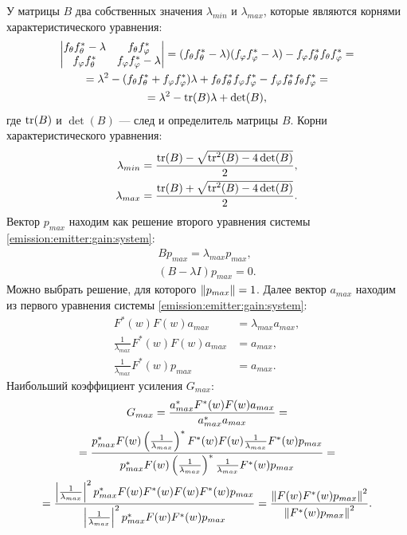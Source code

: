 У матрицы $B$ два собственных значения $\lambda_{min}$ и $\lambda_{max}$, которые являются корнями характеристического уравнения:
\begin{multline*}
    \begin{vmatrix}
        f_\theta f_\theta^* - \lambda & f_{\theta} f_\varphi^*          \\
        f_\varphi f_\theta^*          & f_\varphi f_\varphi^* - \lambda
    \end{vmatrix}
    = (f_\theta f_\theta^* - \lambda) (f_\varphi f_\varphi^* - \lambda) - f_\varphi f_\theta^* f_{\theta} f_\varphi^* = \\
    = \lambda^2 - ( f_\theta f_\theta^* + f_\varphi f_\varphi^* ) \lambda + f_\theta f_\theta^* f_\varphi f_\varphi^* - f_\varphi f_\theta^* f_{\theta} f_\varphi^* = \\
    = \lambda^2 - \operatorname{tr}(B) \lambda + \det(B) ,
\end{multline*}
где $\operatorname{tr}(B)$ и $\det(B)$ --- след и определитель матрицы $B$. Корни характеристического уравнения:
\begin{align}
    \lambda_{min} & = \frac{\operatorname{tr}(B) - \sqrt{\operatorname{tr}^2(B) - 4 \det(B)}}{2} \label{emission:emitter:gain:minimum_eigenvalue} , \\
    \lambda_{max} & = \frac{\operatorname{tr}(B) + \sqrt{\operatorname{tr}^2(B) - 4 \det(B)}}{2} \label{emission:emitter:gain:maximum_eigenvalue}.
\end{align}
Вектор $p_{max}$ находим как решение второго уравнения системы \eqref{emission:emitter:gain:system}:
\begin{gather*}
    B p_{max} = \lambda_{max} p_{max} , \\
    ( B - \lambda I ) p_{max} = 0 .
\end{gather*}
Можно выбрать решение, для которого $\left \| p_{max} \right \| = 1$. Далее вектор $a_{max}$ находим из первого уравнения системы \eqref{emission:emitter:gain:system}:
\begin{align*}
    F^*(w) F(w) a_{max}                         & = \lambda_{max} a_{max} , \\
    \frac{1}{\lambda_{max}} F^*(w) F(w) a_{max} & = a_{max} , \\
    \frac{1}{\lambda_{max}} F^*(w) p_{max}            & = a_{max} .
\end{align*}
Наибольший коэффициент усиления $G_{max}$:
\begin{multline*}
    G_{max}
    = \frac{a_{max}^* F^*(w) F(w) a_{max}}{a_{max}^* a_{max}} = \\
    = \frac{p_{max}^* F(w) \left ( \frac{1}{\lambda_{max}} \right )^* F^*(w) F(w) \frac{1}{\lambda_{max}} F^*(w) p_{max}}{ p_{max}^* F(w) \left ( \frac{1}{\lambda_{max}} \right )^* \frac{1}{\lambda_{max}} F^*(w) p_{max}} = \\
    = \frac{\left | \frac{1}{\lambda_{max}} \right |^2 p_{max}^* F(w) F^*(w) F(w) F^*(w) p_{max}}{ \left | \frac{1}{\lambda_{max}} \right |^2 p_{max}^* F(w) F^*(w) p_{max}}
    = \frac{\left \| F(w) F^*(w) p_{max} \right \|^2}{ \left \| F^*(w) p_{max} \right \|^2} .
\end{multline*}

